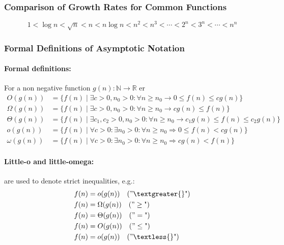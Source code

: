 \subsubsection{Comparison of Growth Rates for Common Functions}

\begin{equation}
  1 < \log n < \sqrt{n} < n < n \log n < n^2 < n^3 < \cdots < 2^n < 3^n < \cdots < n^n
  \label{eq:comparison-of-growth-rates}
\end{equation}

\subsubsection{Formal Definitions of Asymptotic Notation}

\paragraph{Formal definitions:} For a non negative function \( g(n) : \mathbb{N} \rightarrow \mathbb{R} \) er
\begin{align*}
  O(g(n))      & = \{ f(n) \mid \exists c > 0, n_0 > 0 : \forall n \geq n_0 \rightarrow 0 \leq f(n) \leq cg(n) \}                \\
  \Omega(g(n)) & = \{ f(n) \mid \exists c > 0, n_0 > 0 : \forall n \geq n_0 \rightarrow c g(n) \leq f(n) \}                      \\
  \Theta(g(n)) & = \{ f(n) \mid \exists c_1, c_2 > 0, n_0 > 0 : \forall n \geq n_0 \rightarrow c_1g(n) \leq f(n) \leq c_2g(n) \} \\
  o(g(n))      & = \{ f(n) \mid \forall c > 0 : \exists n_0 > 0 : \forall n \geq n_0 \Rightarrow 0 \leq f(n) < c g(n) \}         \\
  \omega(g(n)) & = \{ f(n) \mid \forall c > 0 : \exists n_0 > 0 : \forall n \geq n_0 \Rightarrow c g(n) < f(n) \}
\end{align*}


\paragraph{Little-o and little-omega:} are used to denote strict inequalities, e.g.:
\begin{align*}
  f(n) & = o(g(n)) \quad \text{(}"\textgreater{}\text{")} \\
  f(n) & = \Omega(g(n)) \quad \text{(}"\geq\text{")}      \\
  f(n) & = \Theta(g(n)) \quad \text{(}"=\text{")}         \\
  f(n) & = O(g(n)) \quad \text{(}"\leq\text{")}           \\
  f(n) & = o(g(n)) \quad \text{(}"\textless{}\text{")}
\end{align*}

